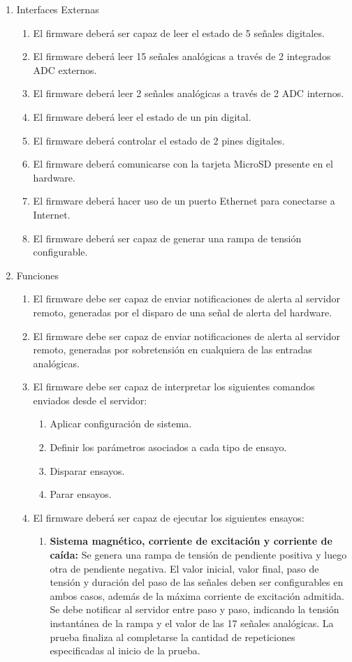 \documentclass[11pt]{charter}
\begin{document}
\begin{enumerate}
\item Interfaces Externas
	\begin{enumerate}
	\item El firmware deberá ser capaz de leer el estado de 5 señales digitales.
	\item El firmware deberá leer 15 señales analógicas a través de 2 integrados ADC externos.
	\item El firmware deberá leer 2 señales analógicas a través de 2 ADC internos.
	\item El firmware deberá leer el estado de un pin digital.
	\item El firmware deberá controlar el estado de 2 pines digitales.
	\item El firmware deberá comunicarse con la tarjeta MicroSD presente en el hardware.
	\item El firmware deberá hacer uso de un puerto Ethernet para conectarse a Internet.
	\item El firmware deberá ser capaz de generar una rampa de tensión configurable.
	\end{enumerate}
\item Funciones
	\begin{enumerate}
	\item El firmware debe ser capaz de enviar notificaciones de alerta al servidor remoto, generadas por el disparo de una señal de alerta del hardware.
	\item El firmware debe ser capaz de enviar notificaciones de alerta al servidor remoto, generadas por sobretensión en cualquiera de las entradas analógicas.
	\item El firmware debe ser capaz de interpretar los siguientes comandos enviados desde el servidor:
		\begin{enumerate}
		\item Aplicar configuración de sistema.
		\item Definir los parámetros asociados a cada tipo de ensayo.
		\item Disparar ensayos.
		\item Parar ensayos.
		\end{enumerate}
	\item El firmware deberá ser capaz de ejecutar los siguientes ensayos:
		\begin{enumerate}
		\item \textbf{Sistema magnético, corriente de excitación y corriente de caída:} Se genera una rampa de tensión de pendiente positiva y luego otra de pendiente negativa. El valor inicial, valor final, paso de tensión y duración del paso de las señales deben ser configurables en ambos casos, además de la máxima corriente de excitación admitida. Se debe notificar al servidor entre paso y paso, indicando la tensión instantánea de la rampa y el valor de las 17 señales analógicas. La prueba finaliza al completarse la cantidad de repeticiones especificadas al inicio de la prueba.

\end{enumerate}
\end{enumerate}
\end{enumerate}
\end{document}
